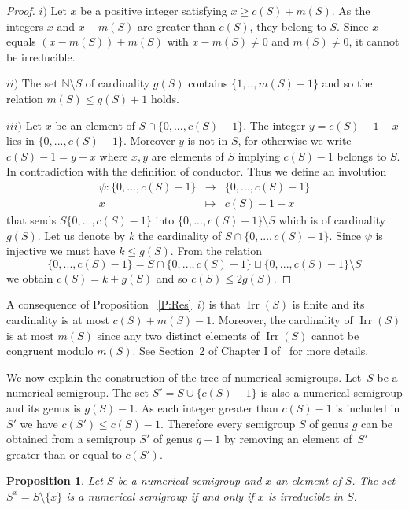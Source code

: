\documentclass[reqno]{amsart}
\theoremstyle{plain}
\newtheorem{prop}{Proposition}[section]
\theoremstyle{definition}
\renewcommand{\leq}{\leqslant}
\renewcommand{\geq}{\geqslant}
\newcommand{\NN}{\mathbb{N}}
\DeclareMathOperator{\Irr}{Irr}
\begin{document}
\begin{proof}
$i)$ Let $x$ be a positive integer satisfying $x \geq c(S)+m(S)$. 
As the integers $x$ and $x-m(S)$ are greater than $c(S)$, they belong to $S$.
Since $x$ equals $(x-m(S))+m(S)$ with $x-m(S)\not=0$ and $m(S)\not=0$, it cannot be irreducible.

$ii)$ The set $\NN\setminus{S}$ of cardinality $g(S)$ contains $\{1,..,m(S)-1\}$ and so the relation $m(S)\leq g(S)+1$ holds.

$iii)$ Let $x$ be an element of $S\cap\{0,...,c(S)-1\}$. 
The integer $y=c(S)-1-x$ lies in $\{0,...,c(S)-1\}$. 
Moreover $y$ is not in $S$, for otherwise  we write $c(S)-1=y+x$ where $x,y$ are elements of $S$ implying $c(S)-1$ belongs to $S$. 
In contradiction with the definition of conductor. 
Thus we define an involution 
\[
\begin{array}{rcl}
\psi:\{0,...,c(S)-1\}&\to&\{0,...,c(S)-1\}\\
x&\mapsto&c(S)-1-x
\end{array}
\]
that sends $S\{0,...,c(S)-1\}$ into $\{0,...,c(S)-1\}\setminus S$ which is  of cardinality~$g(S)$. 
Let us denote by $k$ the cardinality  of $S\cap\{0,...,c(S)-1\}$. 
Since $\psi$ is injective we must have $k\leq g(S)$. 
From the relation 
\[
\{0,...,c(S)-1\}=S\cap\{0,...,c(S)-1\}\sqcup\{0,...,c(S)-1\}\setminus S
\]
 we obtain $c(S)=k+g(S)$ and so $c(S)\leq 2 g(S)$.
\end{proof}

A consequence of Proposition~ \ref{P:Res}~$i)$ is that $\Irr(S)$ is finite and its cardinality is at most $c(S)+m(S)-1$.
Moreover, the cardinality of $\Irr(S)$ is at most $m(S)$ since any two distinct elements of $\Irr(S)$ cannot be congruent modulo $m(S)$. See Section~2 of Chapter I of~\cite{BookNS} for more details.

We now explain the construction of the tree of numerical semigroups.
Let~$S$ be a numerical semigroup. The set $S'=S\cup\{c(S)-1\}$ is also a numerical  semigroup and its genus is $g(S)-1$. 
As  each integer greater than $c(S)-1$ is included in $S'$ we have $c(S')\leq c(S)-1$. 
Therefore every semigroup $S$ of genus $g$ can be obtained from a semigroup $S'$ of genus $g-1$ by removing an element of~$S'$ greater than or equal to $c(S')$.

\begin{prop}
\label{P:Sx}
Let $S$ be a numerical semigroup and $x$ an element of $S$. The set~$S^x=S\setminus\{x\}$ is a numerical semigroup if and only if $x$ is irreducible in $S$.
\end{prop}
\end{document}
